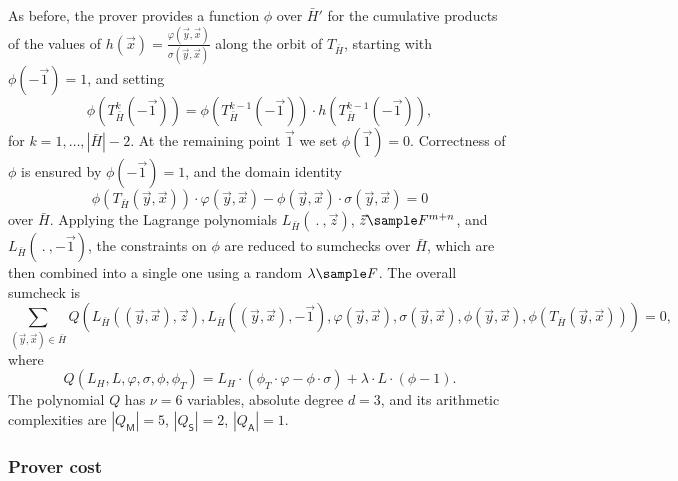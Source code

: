 \documentclass[11pt]{article}
\theoremstyle{definition}
\theoremstyle{remark}
\begin{document}
As before, the prover provides a function $\phi$ over $\bar H'$ for the cumulative products of the values of $h(\vec x) = \frac{\varphi(\vec y, \vec x)}{\sigma(\vec y,\vec x)}$ along the orbit of $T_{\bar H}$, starting with $\phi(-\vec 1)= 1$, and setting
\[
\phi(T_{\bar H}^k (-\vec 1)) = \phi(T_{\bar H}^{k-1} (-\vec 1)) \cdot h(T_{\bar H}^{k-1} (-\vec 1)), 
\] 
for $k=1, \ldots, |\bar H| - 2$. 
At the remaining point $\vec 1$ we set $\phi(\vec 1) = 0$. %
Correctness of $\phi$ is ensured by $\phi(-\vec 1) = 1$, and the domain identity
\begin{equation*}
\phi(T_{\bar H}(\vec y, \vec x)) \cdot \varphi(\vec y, \vec x)
- \phi(\vec y, \vec x) \cdot \sigma(\vec y, \vec x) = 0
\end{equation*}
over $\bar H$.
Applying the Lagrange polynomials $L_{\bar H}(\:.\:, \vec z)$, $\vec z \sample F^{m+n}$, and $L_{\bar H}(\:.\:, -\vec 1)$, the constraints on $\phi$ are reduced to sumchecks over $\bar H$, which are then combined into a single one using a random $\lambda\sample F$.
The overall sumcheck is
\[
\sum_{(\vec y, \vec x)\in \bar H} Q(L_{\bar H}((\vec y, \vec x) , \vec z), L_{\bar H}((\vec y, \vec x), -\vec 1), \varphi(\vec y, \vec x), \sigma(\vec y, \vec x), \phi(\vec y, \vec x),  \phi(T_{\bar H}(\vec y, \vec x))) = 0,
\]
where 
\begin{equation}
Q(L_H, L, \varphi, \sigma,\phi, \phi_T) = 
L_H\cdot (\phi_T\cdot \varphi - \phi\cdot \sigma) + \lambda\cdot L\cdot (\phi - 1).
\end{equation}
The polynomial $Q$ has $\nu=6$ variables, absolute degree $d=3$, and its arithmetic complexities are $|Q_\mathsf M|= 5$, $|Q_\mathsf S| = 2$, $|Q_\mathsf A|= 1$.




\subsubsection*{Prover cost}
\end{document}
